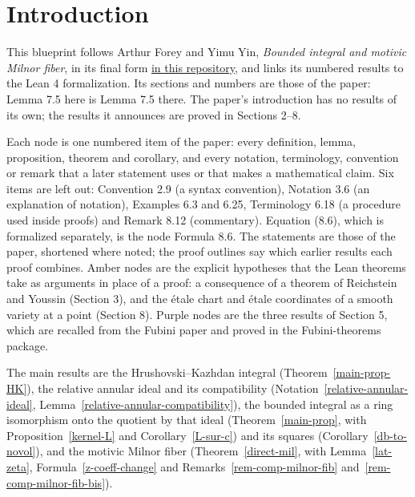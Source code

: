 
\section{Introduction}
\label{section-1}
This blueprint follows Arthur Forey and Yimu Yin, \emph{Bounded integral and motivic Milnor fiber}, in its final form \href{https://github.com/daviddhilbert/diamond-integral/blob/main/paper/bounded-integral-motivic-milnor-fiber.pdf}{in this repository}, and links its numbered results to the Lean 4 formalization. Its sections and numbers are those of the paper: Lemma 7.5 here is Lemma 7.5 there. The paper's introduction has no results of its own; the results it announces are proved in Sections 2--8.

Each node is one numbered item of the paper: every definition, lemma, proposition, theorem and corollary, and every notation, terminology, convention or remark that a later statement uses or that makes a mathematical claim. Six items are left out: Convention 2.9 (a syntax convention), Notation 3.6 (an explanation of notation), Examples 6.3 and 6.25, Terminology 6.18 (a procedure used inside proofs) and Remark 8.12 (commentary). Equation (8.6), which is formalized separately, is the node Formula 8.6. The statements are those of the paper, shortened where noted; the proof outlines say which earlier results each proof combines. Amber nodes are the explicit hypotheses that the Lean theorems take as arguments in place of a proof: a consequence of a theorem of Reichstein and Youssin (Section 3), and the \'etale chart and \'etale coordinates of a smooth variety at a point (Section 8). Purple nodes are the three results of Section 5, which are recalled from the Fubini paper and proved in the Fubini-theorems package.

The main results are the Hrushovski--Kazhdan integral (Theorem~\ref{main-prop-HK}), the relative annular ideal and its compatibility (Notation~\ref{relative-annular-ideal}, Lemma~\ref{relative-annular-compatibility}), the bounded integral as a ring isomorphism onto the quotient by that ideal (Theorem~\ref{main-prop}, with Proposition~\ref{kernel-L} and Corollary~\ref{L-sur-c}) and its squares (Corollary~\ref{db-to-novol}), and the motivic Milnor fiber (Theorem~\ref{direct-mil}, with Lemma~\ref{lat-zeta}, Formula~\ref{z-coeff-change} and Remarks~\ref{rem-comp-milnor-fib} and~\ref{rem-comp-milnor-fib-bis}).


